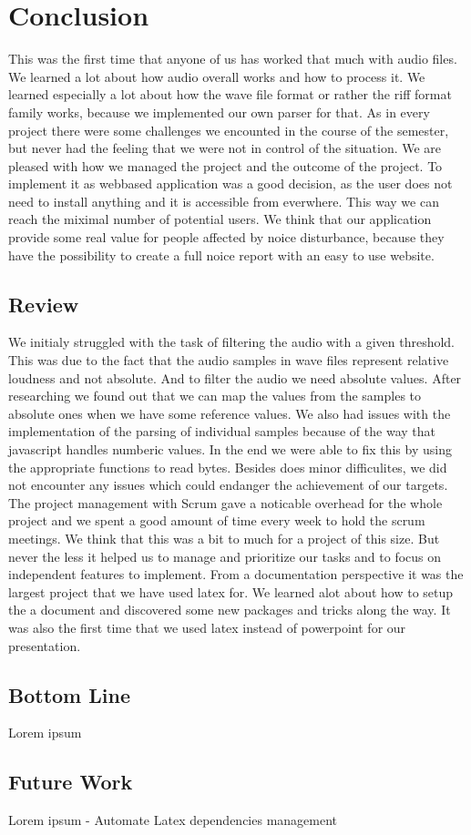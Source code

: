 \section{Conclusion}
This was the first time that anyone of us has worked that much with audio files. We learned a lot about how audio overall works and how to process it. We learned especially a lot about how the wave file format or rather the riff format family works, because we implemented our own parser for that. As in every project there were some challenges we encounted in the course of the semester, but never had the feeling that we were not in control of the situation. We are pleased with how we managed the project and the outcome of the project. To implement it as webbased application was a good decision, as the user does not need to install anything and it is accessible from everwhere. This way we can reach the miximal number of potential users. We think that our application provide some real value for people affected by noice disturbance, because they have the possibility to create a full noice report with an easy to use website.

\subsection{Review}
We initialy struggled with the task of filtering the audio with a given threshold. This was due to the fact that the audio samples in wave files represent relative loudness and not absolute. And to filter the audio we need absolute values. After researching we found out that we can map the values from the samples to absolute ones when we have some reference values. 
We also had issues with the implementation of the parsing of individual samples because of the way that javascript handles numberic values. In the end we were able to fix this by using the appropriate functions to read bytes. Besides does minor difficulites, we did not encounter any issues which could endanger the achievement of our targets. 
The project management with Scrum gave a noticable overhead for the whole project and we spent a good amount of time every week to hold the scrum meetings. We think that this was a bit to much for a project of this size. But never the less it helped us to manage and prioritize our tasks and to focus on independent features to implement. 
From a documentation perspective it was the largest project that we have used latex for. We learned alot about how to setup the a document and discovered some new packages and tricks along the way. It was also the first time that we used latex instead of powerpoint for our presentation.

\subsection{Bottom Line}
Lorem ipsum

\subsection{Future Work}
Lorem ipsum
- Automate Latex dependencies management